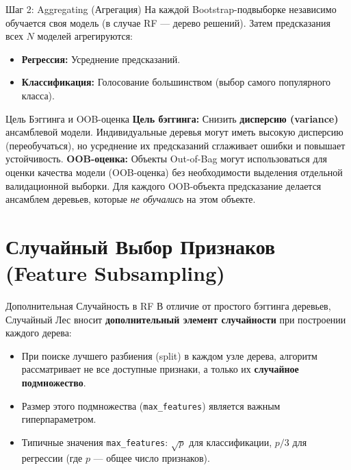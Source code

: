 \begin{myblock}{Шаг 2: Aggregating (Агрегация)}
    На каждой Bootstrap-подвыборке независимо обучается своя модель (в случае RF — дерево решений). Затем предсказания всех \(N\) моделей агрегируются:
    \begin{itemize}[nosep, leftmargin=*]
        \item \textbf{Регрессия:} Усреднение предсказаний.
        \item \textbf{Классификация:} Голосование большинством (выбор самого популярного класса).
    \end{itemize}
\end{myblock}

\begin{textbox}{Цель Бэггинга и OOB-оценка}
    \textbf{Цель бэггинга:} Снизить \textbf{дисперсию (variance)} ансамблевой модели. Индивидуальные деревья могут иметь высокую дисперсию (переобучаться), но усреднение их предсказаний сглаживает ошибки и повышает устойчивость. \newline
    \textbf{OOB-оценка:} Объекты Out-of-Bag могут использоваться для оценки качества модели (OOB-оценка) без необходимости выделения отдельной валидационной выборки. Для каждого OOB-объекта предсказание делается ансамблем деревьев, которые \textit{не обучались} на этом объекте.
\end{textbox}

\section{Случайный Выбор Признаков (Feature Subsampling)}

\begin{myblock}{Дополнительная Случайность в RF}
    В отличие от простого бэггинга деревьев, Случайный Лес вносит \textbf{дополнительный элемент случайности} при построении каждого дерева:
    \begin{itemize}[nosep, leftmargin=*]
        \item При поиске лучшего разбиения (split) в каждом узле дерева, алгоритм рассматривает не все доступные признаки, а только их \textbf{случайное подмножество}.
        \item Размер этого подмножества (\texttt{max\_features}) является важным гиперпараметром.
        \item Типичные значения \texttt{max\_features}: \(\sqrt{p}\) для классификации, \(p/3\) для регрессии (где \(p\) — общее число признаков).
    \end{itemize}
\end{myblock}


